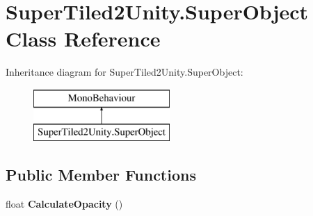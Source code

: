 \hypertarget{class_super_tiled2_unity_1_1_super_object}{}\section{Super\+Tiled2\+Unity.\+Super\+Object Class Reference}
\label{class_super_tiled2_unity_1_1_super_object}
Inheritance diagram for Super\+Tiled2\+Unity.\+Super\+Object\+:\begin{figure}[H]
\begin{center}
\leavevmode
\includegraphics[height=2.000000cm]{class_super_tiled2_unity_1_1_super_object}
\end{center}
\end{figure}
\subsection*{Public Member Functions}
\begin{DoxyCompactItemize}
\item 
\mbox{\label{class_super_tiled2_unity_1_1_super_object_a69f60d7cd4bfae5f5ac73ff0995c685c}} 
float {\bfseries Calculate\+Opacity} ()
\end{DoxyCompactItemize}
